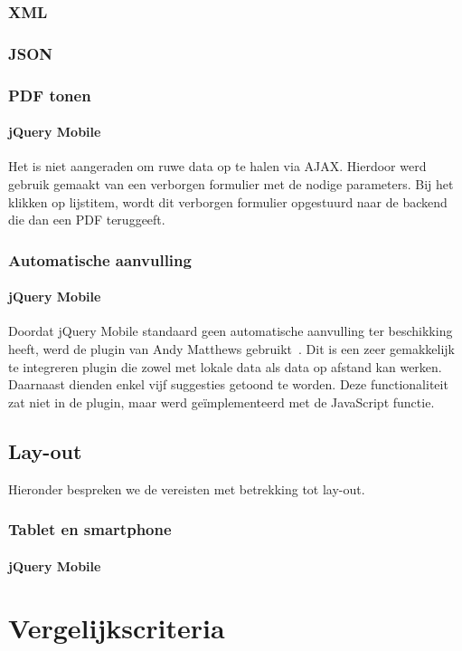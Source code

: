 \subsubsection{XML}

\subsubsection{JSON}

\subsubsection{PDF tonen}

\paragraph{jQuery Mobile} 
Het is niet aangeraden om ruwe data op te halen via AJAX. Hierdoor werd gebruik gemaakt van een verborgen formulier met de nodige parameters. Bij het klikken op lijstitem, wordt dit verborgen formulier opgestuurd naar de backend die dan een PDF teruggeeft.

\subsubsection{Automatische aanvulling}

\paragraph{jQuery Mobile} 
Doordat jQuery Mobile standaard geen automatische aanvulling ter beschikking heeft, werd de plugin van Andy Matthews gebruikt~\cite{Matthews2013}. Dit is een zeer gemakkelijk te integreren plugin die zowel met lokale data als data op afstand kan werken. Daarnaast dienden enkel vijf suggesties getoond te worden. Deze functionaliteit zat niet in de plugin, maar werd geïmplementeerd met de JavaScript  functie.

\subsection{Lay-out}
Hieronder bespreken we de vereisten met betrekking tot lay-out.

\subsubsection{Tablet en smartphone}

\paragraph{jQuery Mobile} 



\section{Vergelijkscriteria}
\label{sec:evaluatie-criteria}